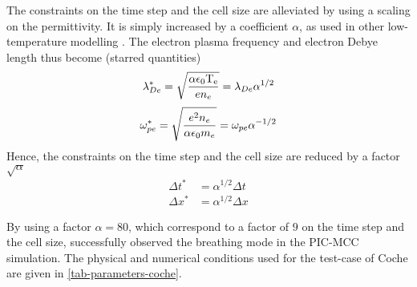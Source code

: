 The constraints on the time step and the cell size are alleviated by using a scaling on the permittivity.
It is simply increased by a coefficient $\alpha$, as used in other low-temperature modelling \citep{fubiani2012,boeuf2012,liu2010}.
The electron plasma frequency and electron Debye length thus become (starred quantities)
\begin{equation} \label{eq-scaled_lde}
  \lambda_{De}^* = \sqrt{\frac{\alpha \epsilon_0 \mathrm{T_e}}{e n_e}} = \lambda_{De} \alpha^{1/2}
\end{equation}
\begin{equation} \label{eq-scaled_wpe}
  \omega_{pe}^* = \sqrt{\frac{e^2 n_e}{\alpha \epsilon_0 m_e}} = \omega_{pe} \alpha^{-1/2}
\end{equation}
Hence, the constraints on the time step and the cell size are reduced by a factor $\sqrt{\alpha}$
\begin{align*}
  \Delta t ^* &= \alpha^{1/2} \Delta t \\
  \Delta x ^*&= \alpha^{1/2} \Delta x  
\end{align*}

By using a factor $\alpha=80$,  which correspond to a factor of $9$ on the time step and the cell size,  \citet{coche2014} successfully observed the breathing mode in the \ac{PIC}-\ac{MCC} simulation.
The physical and numerical conditions used for the test-case of Coche are given in \cref{tab-parameters-coche}.



